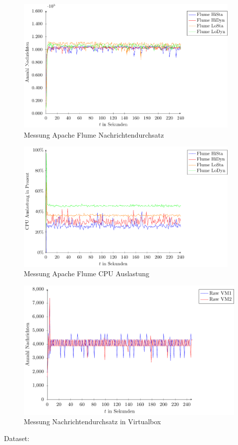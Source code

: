 \begin{figure}
\includegraphics[width=0.97\textwidth]{plots/messungFlumeDurchsatz.pdf}
\caption{Messung Apache Flume Nachrichtendurchsatz
\label{fig:messungFlumeNd}}
\end{figure}
\begin{figure}
\includegraphics[width=0.97\textwidth]{plots/messungFlumeCpu.pdf}
\caption{Messung Apache Flume CPU Auslastung
\label{fig:messungFlumeCpu}}
\end{figure}


\begin{figure}
\includegraphics[width=1.0\textwidth]{plots/virtualBoxRaw.pdf}
\caption{Messung Nachrichtendurchsatz in Virtualbox
\label{fig:messungMaxNachrichten}}
\end{figure}

Dataset: 
